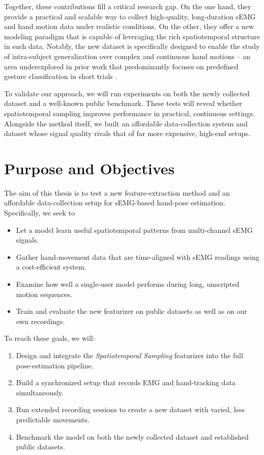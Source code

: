 Together, these contributions fill a critical research gap. On the one hand, they provide a practical and scalable way to collect high-quality, long-duration sEMG and hand motion data under realistic conditions. On the other, they offer a new modeling paradigm that is capable of leveraging the rich spatiotemporal structure in such data. Notably, the new dataset is specifically designed to enable the study of intra-subject generalization over complex and continuous hand motions -- an area underexplored in prior work that predominantly focuses on predefined gesture classification in short trials \cite{salter2024emg2pose}.

To validate our approach, we will run experiments on both the newly collected dataset and a well-known public benchmark. These tests will reveal whether spatiotemporal sampling improves performance in practical, continuous settings. Alongside the method itself, we built an affordable data-collection system and dataset whose signal quality rivals that of far more expensive, high-end setups.

\section{Purpose and Objectives}

The aim of this thesis is to test a new feature-extraction method and an affordable data-collection setup for sEMG-based hand-pose estimation. Specifically, we seek to
\begin{itemize}
    \item Let a model learn useful spatiotemporal patterns from multi-channel sEMG signals.
    \item Gather hand-movement data that are time-aligned with sEMG readings using a cost-efficient system.
    \item Examine how well a single-user model performs during long, unscripted motion sequences.
    \item Train and evaluate the new featurizer on public datasets as well as on our own recordings.
\end{itemize}

To reach these goals, we will:
\begin{enumerate}
    \item Design and integrate the \emph{Spatiotemporal Sampling} featurizer into the full pose-estimation pipeline.
    \item Build a synchronized setup that records EMG and hand-tracking data simultaneously.
    \item Run extended recording sessions to create a new dataset with varied, less predictable movements.
    \item Benchmark the model on both the newly collected dataset and established public datasets.
\end{enumerate}


